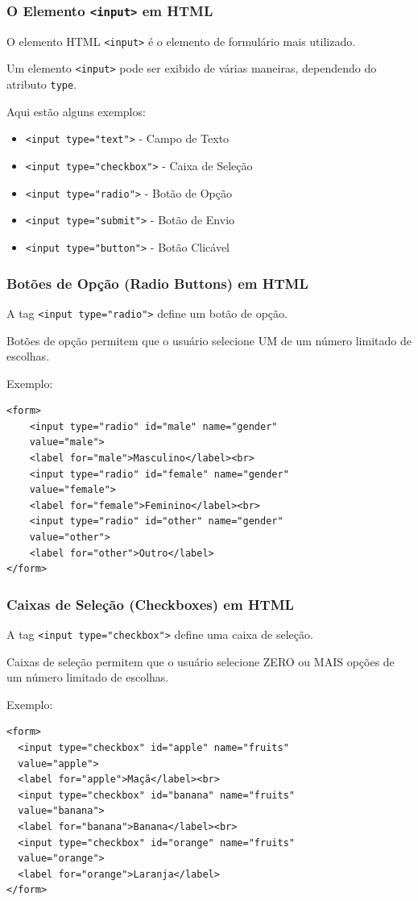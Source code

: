 \documentclass{beamer}
\begin{document}
\begin{frame}
  \frametitle{O Elemento \texttt{<input>} em HTML}

  O elemento HTML \texttt{<input>} é o elemento de formulário mais utilizado.

  Um elemento \texttt{<input>} pode ser exibido de várias maneiras, dependendo do atributo \texttt{type}.

  Aqui estão alguns exemplos:

  \begin{itemize}
    \item \texttt{<input type="text"}\texttt{>} - Campo de Texto
    \item \texttt{<input type="checkbox"}\texttt{>}  - Caixa de Seleção
    \item \texttt{<input type="radio"}\texttt{>}  - Botão de Opção
    \item \texttt{<input type="submit"}\texttt{>}  - Botão de Envio
    \item \texttt{<input type="button"}\texttt{>} - Botão Clicável
  \end{itemize}
\end{frame}

\begin{frame}[fragile]
  \frametitle{Botões de Opção (Radio Buttons) em HTML}

  A tag \texttt{<input type="radio"}\texttt{>} define um botão de opção.

  Botões de opção permitem que o usuário selecione UM de um número limitado de escolhas.

  Exemplo:

\begin{verbatim}
<form>
    <input type="radio" id="male" name="gender"
    value="male">
    <label for="male">Masculino</label><br>
    <input type="radio" id="female" name="gender" 
    value="female">
    <label for="female">Feminino</label><br>
    <input type="radio" id="other" name="gender" 
    value="other">
    <label for="other">Outro</label>
</form>
\end{verbatim}
\end{frame}


\begin{frame}[fragile]
  \frametitle{Caixas de Seleção (Checkboxes) em HTML}

  A tag \texttt{<input type="checkbox"}\texttt{>} define uma caixa de seleção.

  Caixas de seleção permitem que o usuário selecione ZERO ou MAIS opções de um número limitado de escolhas.

  Exemplo:

\begin{verbatim}
<form>
  <input type="checkbox" id="apple" name="fruits" 
  value="apple">
  <label for="apple">Maçã</label><br>
  <input type="checkbox" id="banana" name="fruits" 
  value="banana">
  <label for="banana">Banana</label><br>
  <input type="checkbox" id="orange" name="fruits" 
  value="orange">
  <label for="orange">Laranja</label>
</form>
  \end{verbatim}
\end{frame}
\end{document}
